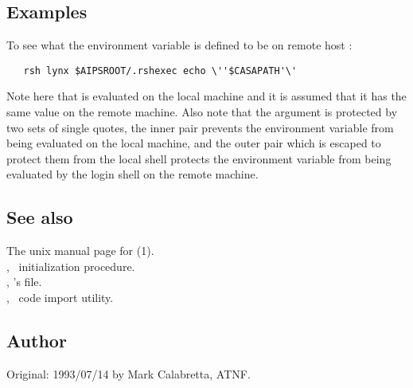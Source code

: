 \subsection*{Examples}

To see what the  environment variable is defined to be on
remote host :

\begin{verbatim}
   rsh lynx $AIPSROOT/.rshexec echo \''$CASAPATH'\'
\end{verbatim}

\noindent
Note here that  is evaluated on the local machine and it is
assumed that it has the same value on the remote machine.  Also note that the
 argument is protected by two sets of single quotes, the
inner pair prevents the environment variable from being evaluated on the local
machine, and the outer pair which is escaped to protect them from the local
shell protects the environment variable from being evaluated by the login
shell on the remote machine.

\subsection*{See also}

The unix manual page for (1).\\
, \aipspp\ initialization procedure.\\
, 's  file.\\
, \aipspp\ code import utility.

\subsection*{Author}

Original: 1993/07/14 by Mark Calabretta, ATNF.
